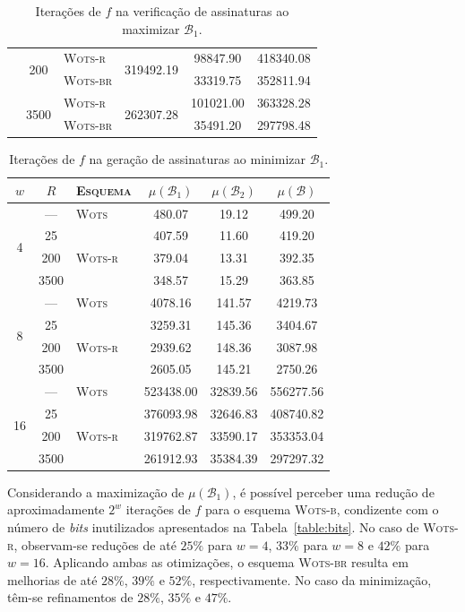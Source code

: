 \documentclass{ufsctex/ufsctex}
\newcommand{\wots}{\textsc{Wots}}
\newcommand{\wotsb}{\textsc{Wots-b}}
\newcommand{\wotsr}{\textsc{Wots-r}}
\newcommand{\wotsbr}{\textsc{Wots-br}}
\begin{document}
\begin{table}
\begin{tabular}{cclccc}
    & \multirow{2}{*}{200}
      & \wotsr{} & \multirow{2}{*}{319492.19} & 98847.90 & 418340.08 \\
    & & \wotsbr{} & & 33319.75 & 352811.94 \\ \cline{2-6}
    & \multirow{2}{*}{3500}
      & \wotsr{} & \multirow{2}{*}{262307.28} & 101021.00 & 363328.28 \\
    & & \wotsbr{} & & 35491.20 & 297798.48 \\
 \bottomrule
 \end{tabular}
  \caption{Iterações de $f$ na verificação de assinaturas ao maximizar
    $\mathcal{B}_1$.}\label{table:argmax}
\end{table}

\begin{table}
  \setlength{\tabcolsep}{8pt}
  \footnotesize
  \centering
  \begin{tabular}{cclccc}
    \toprule
    $w$ & $R$
      & \textsc{Esquema} & $\mu(\mathcal{B}_1)$
      & $\mu(\mathcal{B}_2)$ & $\mu(\mathcal{B})$ \\
    \toprule
    \multirow{4}{*}{4} & --- & \wots{} & 480.07 & 19.12 & 499.20 \\
    & 25 & \multirow{3}{*}{\wotsr{}} & 407.59 & 11.60 & 419.20 \\
    & 200 & & 379.04 & 13.31 & 392.35 \\
    & 3500 & & 348.57 & 15.29 & 363.85 \\
    \midrule
    \multirow{4}{*}{8} & --- & \wots{} & 4078.16 & 141.57 & 4219.73 \\
    & 25 & \multirow{3}{*}{\wotsr{}} & 3259.31 & 145.36 & 3404.67 \\
    & 200 & & 2939.62 & 148.36 & 3087.98 \\
    & 3500 & & 2605.05 & 145.21 & 2750.26 \\
    \midrule
    \multirow{4}{*}{16} & --- & \wots{} & 523438.00 & 32839.56 & 556277.56 \\
    & 25 & \multirow{3}{*}{\wotsr{}} & 376093.98 & 32646.83 & 408740.82 \\
    & 200 & & 319762.87 & 33590.17 & 353353.04 \\
    & 3500 & & 261912.93 & 35384.39 & 297297.32 \\
    \bottomrule
  \end{tabular}
  \caption{Iterações de $f$ na geração de assinaturas ao minimizar
    $\mathcal{B}_1$.}\label{table:argmin}
\end{table}

Considerando a maximização de $\mu(\mathcal{B}_1)$, é possível perceber uma
redução de aproximadamente $2^w$ iterações de $f$ para o esquema \wotsb{},
condizente com o número de \emph{bits} inutilizados apresentados na
Tabela~\ref{table:bits}. No caso de \wotsr{}, observam-se reduções de até $25\%$
para $w = 4$, $33\%$ para $w = 8$ e $42\%$ para $w = 16$. Aplicando ambas as
otimizações, o esquema \wotsbr{} resulta em melhorias de até $28\%$, $39\%$ e
$52\%$, respectivamente. No caso da minimização, têm-se refinamentos de $28\%$,
$35\%$ e $47\%$.
\end{document}
